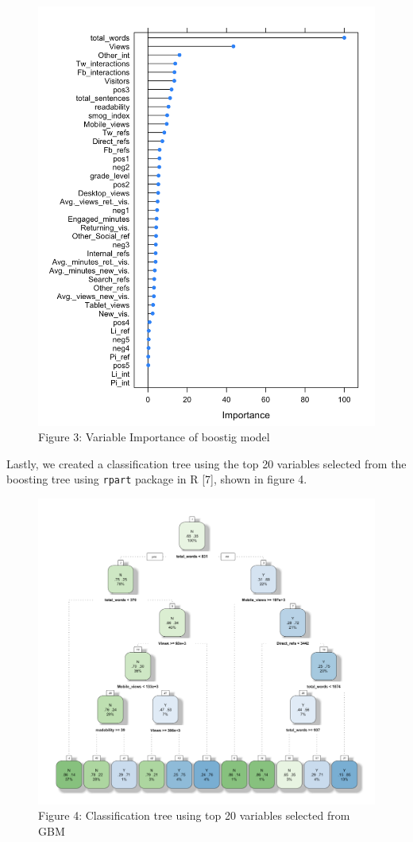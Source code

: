 \documentclass[10pt,letterpaper]{article}
\begin{document}
\begin{figure}
\centering
\includegraphics{boost_VarImp.png}
\caption{Figure 3: Variable Importance of boostig model}
\end{figure}

Lastly, we created a classification tree using the top 20 variables
selected from the boosting tree using \texttt{rpart} package in R
{[}7{]}, shown in figure 4.

\begin{figure}
\centering
\includegraphics{classification Tree.png}
\caption{Figure 4: Classification tree using top 20 variables selected
from GBM}
\end{figure}
\end{document}
